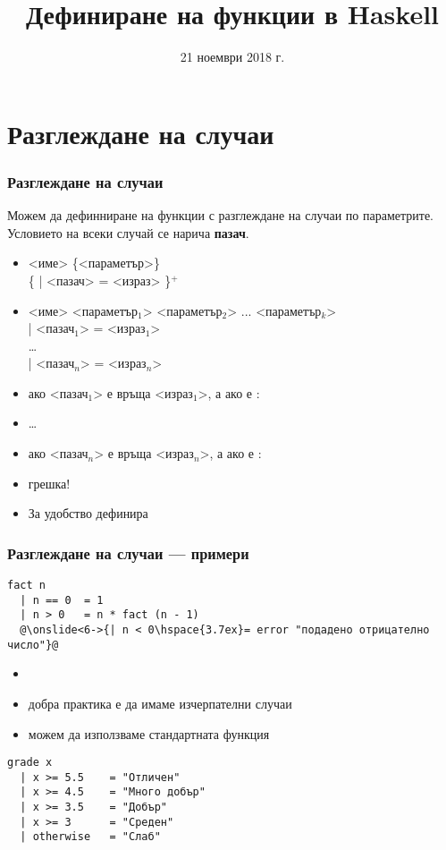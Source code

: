 \documentclass{beamer}
\title{Дефиниране на функции в Haskell}
\date{21 ноември 2018 г.}
\begin{document}
\begin{frame}
  \titlepage
\end{frame}

\section{Разглеждане на случаи}

\begin{frame}[fragile]
  \frametitle{Разглеждане на случаи}

  Можем да дефинниране на функции с разглеждане на случаи по параметрите.\\
  Условието на всеки случай се нарича \textbf{пазач}.
  \begin{itemize}
    \item{} <име> \{<параметър>\}\\
      \hspace{3ex} \{ \tta| <пазач> \tta= <израз> \}$^+$
      \pause
    \item{} <име> <параметър$_1$> <параметър$_2$> ... <параметър$_k$>\\
      \hspace{3ex} \tta| <пазач$_1$> \tta= <израз$_1$>\\
      \hspace{3ex} \ldots\\
      \hspace{3ex} \tta| <пазач$_n$> \tta= <израз$_n$>\\
      \pause
    \item ако <пазач$_1$> е  връща <израз$_1$>, а ако е :
    \item \ldots
    \item ако <пазач$_n$> е  връща <израз$_n$>, а ако е :
    \item \alert{грешка!}
      \pause
    \item За удобство  дефинира 
  \end{itemize}
\end{frame}

\begin{frame}[fragile]
  \frametitle{Разглеждане на случаи --- примери}

\begin{lstlisting}
fact n
  | n == 0  = 1
  | n > 0   = n * fact (n - 1)
  @\onslide<6->{| n < 0\hspace{3.7ex}= error "подадено отрицателно число"}@
\end{lstlisting}
\onslide<+->
\begin{itemize}[<+->]
\item {}
\item добра практика е да имаме изчерпателни случаи
\item можем да използваме стандартната функция 
\end{itemize}
\onslide<+->
\onslide<+->
\begin{lstlisting}
grade x
  | x >= 5.5    = "Отличен"
  | x >= 4.5    = "Много добър"
  | x >= 3.5    = "Добър"
  | x >= 3      = "Среден"
  | otherwise   = "Слаб"
\end{lstlisting}
\end{frame}
\end{document}
